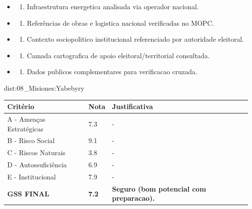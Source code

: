 {\begin{itemize}
\item
  \begin{enumerate}
  \def\labelenumi{\arabic{enumi})}
  \setcounter{enumi}{7}
  \tightlist
  \item
    Infraestrutura energetica analisada via operador nacional.
  \end{enumerate}
\item
  \begin{enumerate}
  \def\labelenumi{\arabic{enumi})}
  \setcounter{enumi}{8}
  \tightlist
  \item
    Referências de obras e logistica nacional verificadas no MOPC.
  \end{enumerate}
\item
  \begin{enumerate}
  \def\labelenumi{\arabic{enumi})}
  \setcounter{enumi}{9}
  \tightlist
  \item
    Contexto sociopolitico institucional referenciado por autoridade
    eleitoral.
  \end{enumerate}
\item
  \begin{enumerate}
  \def\labelenumi{\arabic{enumi})}
  \setcounter{enumi}{10}
  \tightlist
  \item
    Camada cartografica de apoio eleitoral/\allowbreak territorial consultada.
  \end{enumerate}
\item
  \begin{enumerate}
  \def\labelenumi{\arabic{enumi})}
  \setcounter{enumi}{11}
  \tightlist
  \item
    Dados publicos complementares para verificacao cruzada.
  \end{enumerate}
\end{itemize}}{dist:08_Misiones:Yabebyry}
\begin{table}[ht!]
\small \begin{tabular}{p{3.0cm}p{0.8cm}p{6.0cm}} \toprule
\textbf{Critério} & \textbf{Nota} & \textbf{Justificativa} \\ \midrule
A - Ameaças Estratégicas & 7.3 & - \\
B - Risco Social & 9.1 & - \\
C - Riscos Naturais & 3.8 & - \\
D - Autossuficiência & 6.9 & - \\
E - Institucional & 7.9 & - \\
\midrule \textbf{GSS FINAL} & \textbf{7.2} & \textbf{Seguro (bom potencial com preparacao).} \\ \bottomrule \end{tabular}
\end{table}
